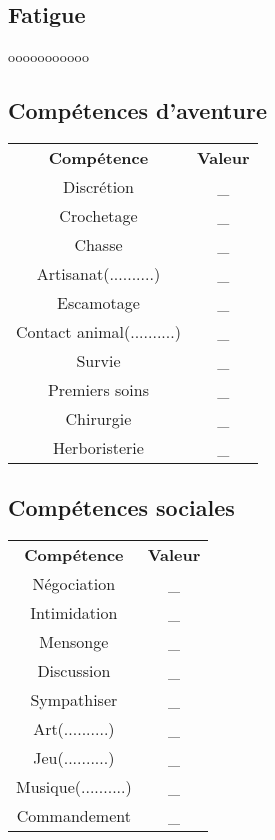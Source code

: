 \documentclass[10pt,a4paper]{article}
\begin{document}
\begin{multicols}{3}
  \subsection*{Fatigue}
  \centering
  ooooooooooo
  
   \columnbreak
  \subsection*{Compétences d'aventure}
  \begin{tabular}{cc}
  \textbf{Compétence}& \textbf{Valeur}\\
  Discrétion& \_\\
  Crochetage & \_\\
  Chasse& \_\\
  Artisanat(..........)& \_\\
  Escamotage& \_\\
  Contact animal(..........)& \_\\
  Survie& \_\\
  Premiers soins& \_\\
  Chirurgie& \_\\
  Herboristerie& \_\\
  \end{tabular}
  
  \subsection*{Compétences sociales}
  \begin{tabular}{cc}
  \textbf{Compétence}& \textbf{Valeur}\\
  Négociation& \_\\
  Intimidation& \_\\
  Mensonge& \_\\
  Discussion& \_\\
  Sympathiser& \_\\
  Art(..........)& \_\\
  Jeu(..........)& \_\\
  Musique(..........)& \_\\
  Commandement& \_\\
  \end{tabular}

\end{multicols}
\end{document}
